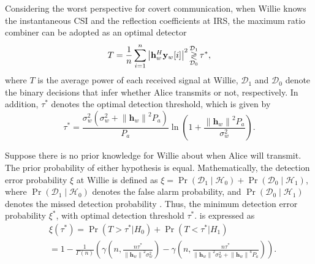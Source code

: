 \documentclass[conference]{IEEEtran}
\begin{document}
Considering the worst perspective for covert communication, when Willie knows the instantaneous CSI and the reflection coefficients at IRS, the maximum ratio combiner can be adopted as an optimal detector \cite{multi_antenna}
\begin{equation}
	T = \frac{1}{n}\sum\limits_{i = 1}^n {{{\left| {{{\bf{h}}_w^H}{{\mathbf{y}}_w}[i]} \right|}^2}} \mathop {\mathop  \gtrless \limits^{{\mathcal{D}_1}} }\limits_{{\mathcal{D}_0}} {\tau ^*},
\end{equation}
where $T$ is the average power of each received signal at Willie, $\mathcal{D}_1$ and $\mathcal{D}_0$ denote the binary decisions that infer whether Alice transmits or not, respectively. In addition, $\tau ^*$ denotes the optimal detection threshold, which is given by \cite{multi_antenna,hardware}
\begin{equation}\label{optimal_threshold1}
	{\tau ^*} = \frac{{\sigma _w^2\left( {\sigma _w^2 + {{\left\| {{{\mathbf{h}}_w}} \right\|}^2}{P_a}} \right)}}{{{P_a}}}\ln \left( {1 + \frac{{{{\left\| {{{\mathbf{h}}_w}} \right\|}^2}{P_a}}}{{\sigma _w^2}}} \right).
\end{equation}

Suppose there is no prior knowledge for Willie about when Alice will transmit. The prior probability of either hypothesis is equal. Mathematically, the detection error probability $\xi$ at Willie is defined as $	\xi=\operatorname{Pr}\left(\mathcal{D}_1 \mid \mathcal{H}_0\right)+\operatorname{Pr}\left(\mathcal{D}_0 \mid \mathcal{H}_1\right)$, where $ {\Pr}\left(\mathcal{D}_1 \mid \mathcal{H}_0\right)$ denotes the false alarm probability, and $ {\Pr}\left(\mathcal{D}_0 \mid \mathcal{H}_1\right)$ denotes the missed detection probability \cite{self3}. Thus, the minimum detection error probability $\xi^*$, with optimal detection threshold $\tau^*$. is expressed as \cite{linear}
\begin{equation}\label{Pd1}
	\begin{aligned}
		&\xi \left( {{\tau^* }} \right) = \Pr \left( {T > {\tau^* }|{H_0}} \right) + \Pr \left( {T < {\tau^* }|{H_1}} \right)\\
		& \!=\! 1 \!-\! \frac{1}{{\Gamma \!\left(\! n \!\right)\!}}\!\left(\! \!{\gamma \!\left(\!\! {n,\frac{{n{\tau ^*}}}{{{{\left\| {{{\mathbf{h}}_w}} \right\|}^2}\sigma _w^2}}} \!\right)\!\! -\! \gamma \!\left(\!\! {n,\!\frac{{n{\tau ^*}}}{{{{\left\| {{{\mathbf{h}}_w}} \right\|}^2}\sigma _w^2 \!+\! {{\left\| {{{\mathbf{h}}_w}} \right\|}^4}{P_a}}}} \!\right)\!} \!\right)\!.
	\end{aligned}
\end{equation}
\end{document}
